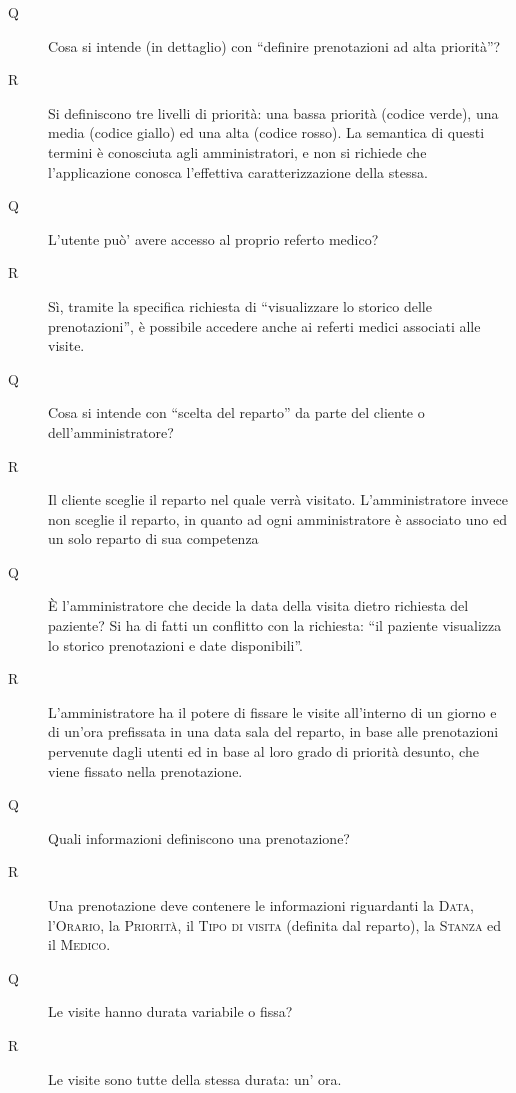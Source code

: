 \begin{description}
\item[Q] Cosa si intende (in dettaglio) con ``definire prenotazioni ad alta priorità''?
\item[R] Si definiscono tre livelli di priorità: una bassa priorità (codice verde), una media (codice giallo) ed una alta (codice rosso). La semantica di questi termini è conosciuta agli amministratori, e non si richiede che l'applicazione conosca l'effettiva caratterizzazione della stessa. 
\medskip


\item[Q] L'utente può' avere accesso al proprio referto medico?
\item[R] Sì, tramite la specifica richiesta di ``visualizzare lo storico delle prenotazioni'', è possibile accedere anche ai referti medici associati alle visite.
\medskip





\item[Q] Cosa si intende con ``scelta del reparto'' da parte del cliente o dell'amministratore?
\item[R] Il cliente sceglie il reparto nel quale verrà visitato. 
   L'amministratore invece non sceglie il reparto, in quanto ad ogni amministratore è associato uno ed un solo reparto di sua competenza
\medskip


\item[Q] È l'amministratore che decide la data della visita dietro richiesta del paziente?
Si ha di fatti un conflitto con la richiesta: ``il paziente visualizza lo storico prenotazioni e date disponibili''.
\item[R] L'amministratore ha il potere di fissare le visite all'interno di un giorno e di un'ora prefissata in una data sala del reparto, in base alle prenotazioni pervenute dagli utenti ed in base al loro grado di priorità desunto, che viene fissato nella prenotazione.
\medskip


\item[Q] Quali informazioni definiscono una prenotazione?
\item[R] Una prenotazione deve contenere le informazioni riguardanti la \textsc{Data}, l'\textsc{Orario}, la \textsc{Priorità}, il \textsc{Tipo di visita} (definita dal reparto), la \textsc{Stanza} ed il \textsc{Medico}.
\medskip


\item[Q] Le visite hanno durata variabile o fissa?
\item[R] Le visite sono tutte della stessa durata: un' ora. 
\medskip



\end{description}
